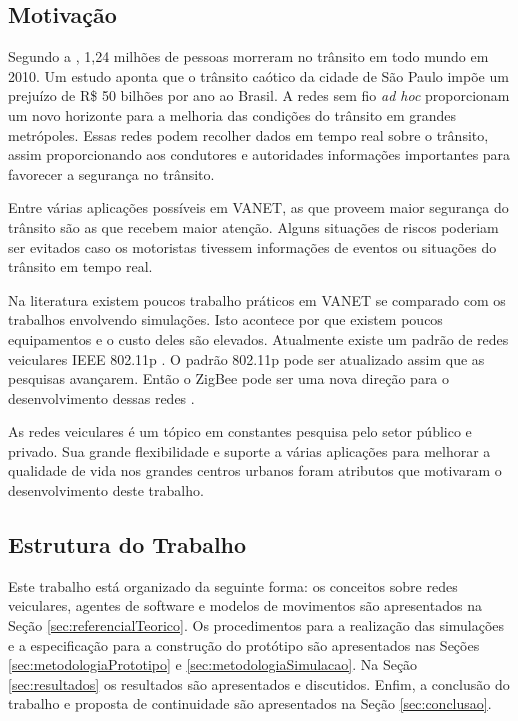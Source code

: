 \subsection{Motivação}

Segundo a \cite{oms:2013}, 1,24 milhões de pessoas morreram no trânsito em todo mundo em 2010. Um estudo \cite{Cintra:2012} aponta que o trânsito caótico da cidade de São Paulo impõe um prejuízo de R\$ 50 bilhões por ano ao Brasil. A redes sem fio \emph{ad hoc} proporcionam um novo horizonte para a melhoria das condições do trânsito em grandes metrópoles. Essas redes podem recolher dados em tempo real sobre o trânsito, assim proporcionando aos condutores e autoridades informações importantes para favorecer a segurança no trânsito.  	

Entre várias aplicações possíveis em VANET, as que proveem maior segurança do trânsito são as que recebem maior atenção. Alguns situações de riscos poderiam ser evitados caso os motoristas tivessem informações de eventos ou situações do trânsito em tempo real.

Na literatura existem poucos trabalho práticos em VANET se comparado com os trabalhos envolvendo simulações. Isto acontece por que existem poucos equipamentos e o custo deles são elevados. Atualmente existe um padrão de redes veiculares IEEE 802.11p \cite{Jiang:2008}. O padrão 802.11p pode ser atualizado assim que as pesquisas avançarem. Então o ZigBee pode ser uma nova direção para o desenvolvimento dessas redes \cite{Bhargav:2013}. 

As redes veiculares é um tópico em constantes pesquisa pelo setor público e privado. Sua grande flexibilidade e suporte a várias aplicações para melhorar a qualidade de vida nos grandes centros urbanos foram atributos que motivaram o desenvolvimento deste trabalho.

\subsection{Estrutura do Trabalho}

Este trabalho está organizado da seguinte forma: os conceitos sobre redes veiculares, agentes de software e modelos de movimentos são apresentados na Seção \ref{sec:referencialTeorico}. Os procedimentos para a realização das simulações e a especificação para a construção do protótipo são apresentados nas Seções \ref{sec:metodologiaPrototipo} e \ref{sec:metodologiaSimulacao}. Na Seção \ref{sec:resultados} os resultados são apresentados e discutidos. Enfim, a conclusão do trabalho e proposta de continuidade são apresentados na Seção \ref{sec:conclusao}.
